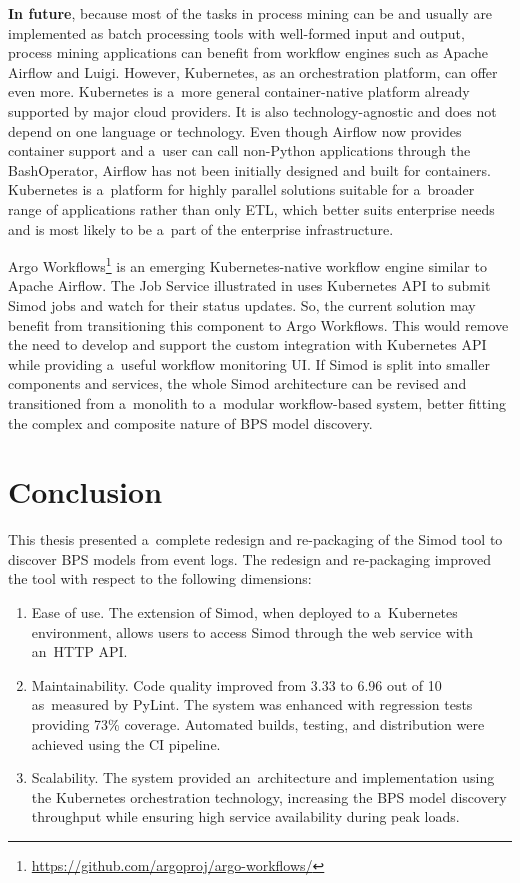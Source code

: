 \documentclass[12pt]{article}
\begin{document}
\textbf{In future}, because most of the tasks in process mining can be and usually are implemented as batch processing tools with well-formed input and output, process mining applications can benefit from workflow engines such as Apache Airflow and Luigi. However, Kubernetes, as an orchestration platform, can offer even more. Kubernetes is a~more general container-native platform already supported by major cloud providers. It is also technology-agnostic and does not depend on one language or technology. Even though Airflow now provides container support and a~user can call non-Python applications through the BashOperator, Airflow has not been initially designed and built for containers. Kubernetes is a~platform for highly parallel solutions suitable for a~broader range of applications rather than only ETL, which better suits enterprise needs and is most likely to be a~part of the enterprise infrastructure. 

Argo Workflows\footnote{\href{https://github.com/argoproj/argo-workflows/}{https://github.com/argoproj/argo-workflows/}} is an emerging Kubernetes-native workflow engine similar to Apache Airflow. The Job Service illustrated in  uses Kubernetes API to submit Simod jobs and watch for their status updates. So, the current solution may benefit from transitioning this component to Argo Workflows. This would remove the need to develop and support the custom integration with Kubernetes API while providing a~useful workflow monitoring UI. If Simod is split into smaller components and services, the whole Simod architecture can be revised and transitioned from a~monolith to a~modular workflow-based system, better fitting the complex and composite nature of BPS model discovery.

\clearpage
\section*{Conclusion}

This thesis presented a~complete redesign and re-packaging of the Simod tool to discover BPS models from event logs. 
The redesign and re-packaging improved the tool with respect to the following dimensions:

\begin{enumerate}
    \item Ease of use. The extension of Simod, when deployed to a~Kubernetes environment, allows users to access Simod through the web service with an~HTTP API.

    \item Maintainability. Code quality improved from 3.33 to 6.96 out of 10 as~measured by PyLint. The system was enhanced with regression tests providing 73\% coverage. Automated builds, testing, and distribution were achieved using the CI pipeline.
    
    \item Scalability. The system provided an~architecture and implementation using the Kubernetes orchestration technology, increasing the BPS model discovery throughput while ensuring high service availability during peak loads.
\end{enumerate}
\end{document}
